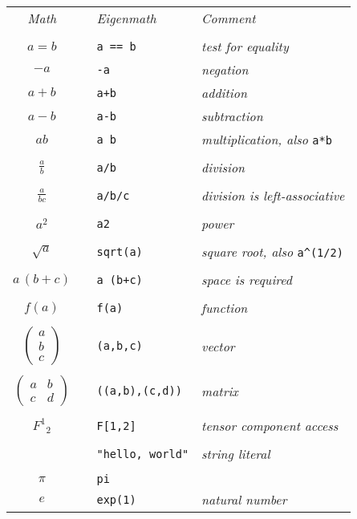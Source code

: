 \documentclass[12pt]{article}
\begin{document}
\begin{tabular}{clll}
{\it Math} & & {\it Eigenmath} & {\it Comment}
\\
\\
$a=b$ & & \verb$a == b$ & {\it test for equality}
\\[1ex]
$-a$ & & {\tt -a} & {\it negation}
\\[1ex]
$a+b$ & & {\tt a+b} & {\it addition}
\\[1ex]
$a-b$ & & {\tt a-b} & {\it subtraction}
\\[1ex]
$ab$ & & {\tt a b} & {\it multiplication, also} \verb$a*b$
\\
\\
$\displaystyle\frac{a}{b}$ & & {\tt a/b} & {\it division}
\\
\\
$\displaystyle\frac{a}{bc}$ & & {\tt a/b/c} & {\it division is left-associative}
\\
\\
$a^2$ & & {\tt a{\char94}2} & {\it power}
\\
\\
$\sqrt{a}$ & & \verb$sqrt(a)$ & {\it square root, also} \verb$a^(1/2)$
\\
\\
$a\,(b+c)$ & & {\tt a (b+c)} & {\it space is required}
\\
\\
$f(a)$ & & {\tt f(a)} & {\it function}
\\
\\
$\begin{pmatrix}a\\ b\\ c\end{pmatrix}$ & & {\tt (a,b,c)} & {\it vector}
\\
\\
$\begin{pmatrix}a&b\\ c&d\end{pmatrix}$ & & {\tt ((a,b),(c,d))} & {\it matrix}
\\
\\
$F^1{}_2$ & & {\tt F[1,2]} & {\it tensor component access}
\\
\\
 & & \verb$"hello, world"$ & {\it string literal}
\\
\\
$\pi$ & & {\tt pi} &
\\[1ex]
$e$ && {\tt exp(1)} & {\it natural number}
\end{tabular}
\end{document}
